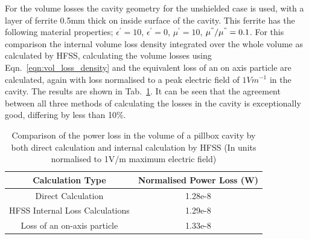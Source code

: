 For the volume losses the cavity geometry for the unshielded case is used, with a layer of ferrite 0.5mm thick on inside surface of the cavity. This ferrite has the following material properties; $\epsilon^{'} = 10$, $\epsilon^{'}=0$, $\mu^{'}=10$, $\mu^{"} / \mu^{"} = 0.1$. For this comparison the internal volume loss density integrated over the whole volume as calculated by HFSS, calculating the volume losses using Eqn.~\ref{eqn:vol_loss_density} and the equivalent loss of an on axis particle are calculated, again with loss normalised to a peak electric field of $1 V m^{-1}$ in the cavity. The results are shown in Tab.~\ref{tab:volume_losses_ferr}. It can be seen that the agreement between all three methods of calculating the losses in the cavity is exceptionally good, differing by less than 10\%.

\begin{table}
\caption{Comparison of the power loss in the volume of a pillbox cavity by both direct calculation and internal calculation by HFSS (In units normalised to 1V/m maximum electric field)}
\begin{center}
\begin{tabular}{c | c }
Calculation Type & Normalised Power Loss (W)\\ \hline
Direct Calculation & 1.28e-8\\ \hline
HFSS Internal Loss Calculations & 1.29e-8 \\ \hline
Loss of an on-axis particle & 1.33e-8 \\
\end{tabular}
\end{center}
\label{tab:volume_losses_ferr}
\end{table}


